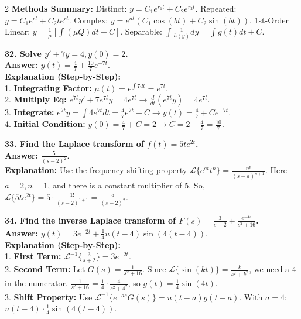 \documentclass[4pt]{extarticle}
\begin{document}
\begin{multicols}{2}
\textbf{Methods Summary:} Distinct: $y = C_1e^{r_1t} + C_2e^{r_2t}$. Repeated: $y = C_1e^{rt} + C_2te^{rt}$. Complex: $y = e^{at}(C_1 \cos(bt) + C_2 \sin(bt))$. 1st-Order Linear: $y = \frac{1}{\mu} [\int (\mu Q) dt + C]$. Separable: $\int \frac{1}{h(y)} dy = \int g(t) dt + C$.

\textbf{32. Solve $y' + 7y = 4, y(0)=2$.} \\
\textbf{Answer:} $y(t) = \frac{4}{7} + \frac{10}{7}e^{-7t}$. \\
\textbf{Explanation (Step-by-Step):} \\
1. \textbf{Integrating Factor:} $\mu(t) = e^{\int 7 dt} = e^{7t}$. \\
2. \textbf{Multiply Eq:} $e^{7t}y' + 7e^{7t}y = 4e^{7t} \rightarrow \frac{d}{dt}(e^{7t}y) = 4e^{7t}$. \\
3. \textbf{Integrate:} $e^{7t}y = \int 4e^{7t} dt = \frac{4}{7}e^{7t} + C \rightarrow y(t) = \frac{4}{7} + Ce^{-7t}$. \\
4. \textbf{Initial Condition:} $y(0) = \frac{4}{7} + C = 2 \rightarrow C = 2 - \frac{4}{7} = \frac{10}{7}$.

\textbf{33. Find the Laplace transform of $f(t) = 5te^{2t}$.} \\
\textbf{Answer:} $\frac{5}{(s-2)^2}$. \\
\textbf{Explanation:} Use the frequency shifting property $\mathcal{L}\{e^{at}t^n\} = \frac{n!}{(s-a)^{n+1}}$. Here $a=2, n=1$, and there is a constant multiplier of 5. So, $\mathcal{L}\{5te^{2t}\} = 5 \cdot \frac{1!}{(s-2)^{1+1}} = \frac{5}{(s-2)^2}$.

\textbf{34. Find the inverse Laplace transform of $F(s) = \frac{3}{s+2} + \frac{e^{-4s}}{s^2+16}$.} \\
\textbf{Answer:} $y(t) = 3e^{-2t} + \frac{1}{4}u(t-4)\sin(4(t-4))$. \\
\textbf{Explanation (Step-by-Step):} \\
1. \textbf{First Term:} $\mathcal{L}^{-1}\{\frac{3}{s+2}\} = 3e^{-2t}$. \\
2. \textbf{Second Term:} Let $G(s) = \frac{1}{s^2+16}$. Since $\mathcal{L}\{\sin(kt)\} = \frac{k}{s^2+k^2}$, we need a 4 in the numerator. $\frac{1}{s^2+16} = \frac{1}{4} \cdot \frac{4}{s^2+4^2}$, so $g(t) = \frac{1}{4}\sin(4t)$. \\
3. \textbf{Shift Property:} Use $\mathcal{L}^{-1}\{e^{-as}G(s)\} = u(t-a)g(t-a)$. With $a=4$: $u(t-4) \cdot \frac{1}{4}\sin(4(t-4))$.

\end{multicols}
\end{document}
